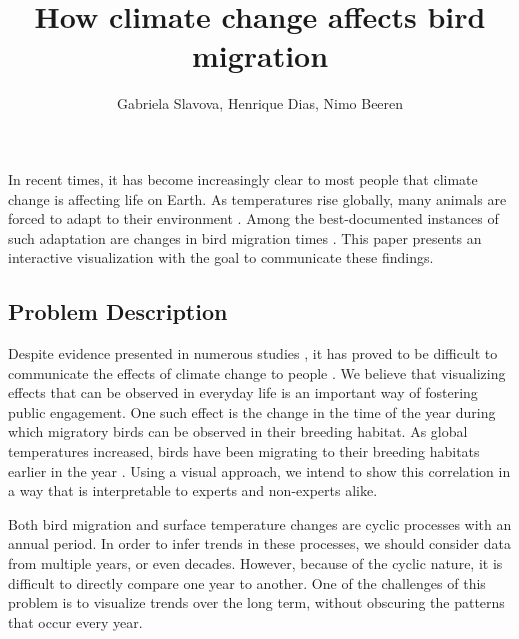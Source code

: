 \documentclass[journal]{vgtc}                %
\title{How climate change affects bird migration}
\author{Gabriela Slavova, Henrique Dias, Nimo Beeren}
\begin{document}


\maketitle

In recent times, it has become increasingly clear to most people that climate change is affecting life on Earth. As temperatures rise globally, many animals are forced to adapt to their environment \cite{parmesan2007pheno,gaughan2009domestic,root2003fingerprints}. Among the best-documented instances of such adaptation are changes in bird migration times \cite{miller2008bird,visser2008climate,jenni2003timing}. This paper presents an interactive visualization with the goal to communicate these findings.

\subsection{Problem Description}

Despite evidence presented in numerous studies \cite{solomon2007climate,parry2007climate}, it has proved to be difficult to communicate the effects of climate change to people \cite{lee2015predictors,brulle2012shifting,moser2011communicating}. We believe that visualizing effects that can be observed in everyday life is an important way of fostering public engagement. One such effect is the change in the time of the year during which migratory birds can be observed in their breeding habitat. As global temperatures increased, birds have been migrating to their breeding habitats earlier in the year \cite{cotton2003avian,huppop2003north,marra2005influence}. Using a visual approach, we intend to show this correlation in a way that is interpretable to experts and non-experts alike.

Both bird migration and surface temperature changes are cyclic processes with an annual period. In order to infer trends in these processes, we should consider data from multiple years, or even decades. However, because of the cyclic nature, it is difficult to directly compare one year to another. One of the challenges of this problem is to visualize trends over the long term, without obscuring the patterns that occur every year.
\end{document}
